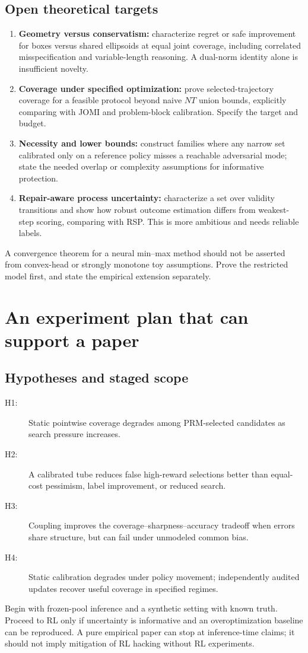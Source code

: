 \subsection{Open theoretical targets}
\begin{enumerate}
\item \textbf{Geometry versus conservatism:} characterize regret or safe
improvement for boxes versus shared ellipsoids at equal joint coverage, including
correlated misspecification and variable-length reasoning. A dual-norm identity
alone is insufficient novelty.
\item \textbf{Coverage under specified optimization:} prove selected-trajectory
coverage for a feasible protocol beyond naive $N T$ union bounds, explicitly
comparing with JOMI and problem-block calibration. Specify the target and budget.
\item \textbf{Necessity and lower bounds:} construct families where any narrow
set calibrated only on a reference policy misses a reachable adversarial mode;
state the needed overlap or complexity assumptions for informative protection.
\item \textbf{Repair-aware process uncertainty:} characterize a set over validity
transitions and show how robust outcome estimation differs from weakest-step
scoring, comparing with RSP. This is more ambitious and needs reliable labels.
\end{enumerate}
A convergence theorem for a neural min--max method should not be asserted from
convex-head or strongly monotone toy assumptions. Prove the restricted model
first, and state the empirical extension separately.

\section{An experiment plan that can support a paper}
\label{sec:experiments}
\subsection{Hypotheses and staged scope}
\begin{description}
\item[H1:] Static pointwise coverage degrades among PRM-selected candidates as
search pressure increases.
\item[H2:] A calibrated tube reduces false high-reward selections better than
equal-cost pessimism, label improvement, or reduced search.
\item[H3:] Coupling improves the coverage--sharpness--accuracy tradeoff when
errors share structure, but can fail under unmodeled common bias.
\item[H4:] Static calibration degrades under policy movement; independently
audited updates recover useful coverage in specified regimes.
\end{description}
Begin with frozen-pool inference and a synthetic setting with known truth.
Proceed to RL only if uncertainty is informative and an overoptimization
baseline can be reproduced. A pure empirical paper can stop at inference-time
claims; it should not imply mitigation of RL hacking without RL experiments.

